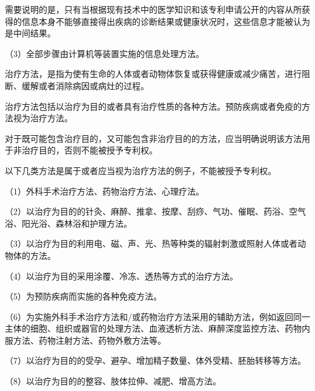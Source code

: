 需要说明的是，只有当根据现有技术中的医学知识和该专利申请公开的内容从所获得的信息本身不能够直接得出疾病的诊断结果或健康状况时，这些信息才能被认为是中间结果。

{\setlength{\parindent}{17.1bp}（3）全部步骤由计算机等装置实施的信息处理方法。\par}

治疗方法，是指为使有生命的人体或者动物体恢复或获得健康或减少痛苦，进行阻断、缓解或者消除病因或病灶的过程。

治疗方法包括以治疗为目的或者具有治疗性质的各种方法。预防疾病或者免疫的方法视为治疗方法。

对于既可能包含治疗目的，又可能包含非治疗目的的方法，应当明确说明该方法用于非治疗目的，否则不能被授予专利权。

以下几类方法是属于或者应当视为治疗方法的例子，不能被授予专利权。

{\setlength{\parindent}{17.1bp}（1）外科手术治疗方法、药物治疗方法、心理疗法。\par}

{\setlength{\parindent}{17.1bp}（2）以治疗为目的的针灸、麻醉、推拿、按摩、刮痧、气功、催眠、药浴、空气浴、阳光浴、森林浴和护理方法。\par}

{\setlength{\parindent}{17.1bp}（3）以治疗为目的利用电、磁、声、光、热等种类的辐射刺激或照射人体或者动物体的方法。\par}

{\setlength{\parindent}{17.1bp}（4）以治疗为目的采用涂覆、冷冻、透热等方式的治疗方法。\par}

{\setlength{\parindent}{17.1bp}（5）为预防疾病而实施的各种免疫方法。\par}

{\setlength{\parindent}{17.1bp}（6）为实施外科手术治疗方法和/或药物治疗方法采用的辅助方法，例如返回同一主体的细胞、组织或器官的处理方法、血液透析方法、麻醉深度监控方法、药物内服方法、药物注射方法、药物外敷方法等。\par}

{\setlength{\parindent}{17.1bp}（7）以治疗为目的的受孕、避孕、增加精子数量、体外受精、胚胎转移等方法。\par}

{\setlength{\parindent}{17.1bp}（8）以治疗为目的的整容、肢体拉伸、减肥、增高方法。\par}

